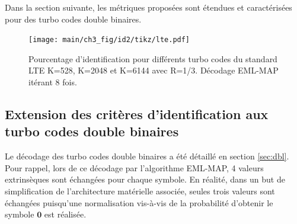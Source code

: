 Dans la section suivante, les métriques proposées sont étendues et caractérisées pour des turbo codes double 
binaires.

\begin{figure}[!h]
	\centering
	\hspace*{-1cm}
	\texttt{[image: main/ch3\_fig/id2/tikz/lte.pdf]}
	\caption{Pourcentage d'identification pour différents turbo codes du standard LTE K=528, K=2048 et K=6144 avec R=1/3.
	Décodage EML-MAP itérant 8 fois. \label{fig:idLTE}}
\end{figure}

\subsection{Extension des critères d'identification aux turbo codes double binaires}
Le décodage des turbo codes double binaires a été détaillé en section \ref{sec:dbl}. Pour rappel, lors de ce décodage par
l'algorithme EML-MAP, 4 valeurs extrinsèques sont échangées pour chaque symbole. En réalité, dans un but de simplification de 
l'architecture matérielle associée, seules trois valeurs sont échangées puisqu'une normalisation vis-à-vis de 
la probabilité d'obtenir le symbole $\mathbf{0}$ est réalisée. 

